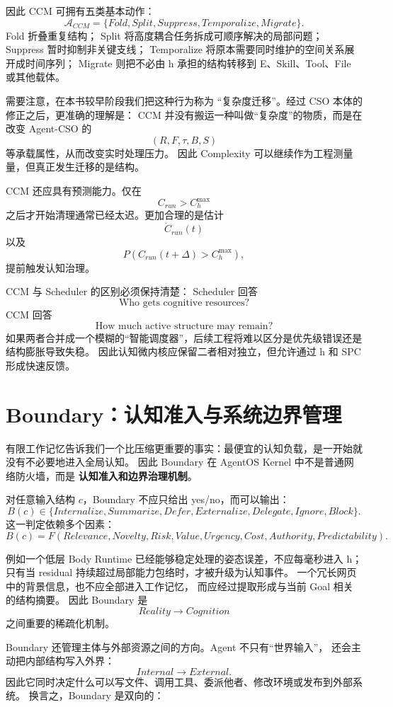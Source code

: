 因此 CCM 可拥有五类基本动作：
\[
\mathcal A_{CCM}
=
\{
Fold,
Split,
Suppress,
Temporalize,
Migrate
\}.
\]
Fold 折叠重复结构；
Split 将高度耦合任务拆成可顺序解决的局部问题；
Suppress 暂时抑制非关键支线；
Temporalize 将原本需要同时维护的空间关系展开成时间序列；
Migrate 则把不必由 h 承担的结构转移到 E、Skill、Tool、File 或其他载体。

需要注意，在本书较早阶段我们把这种行为称为
``复杂度迁移''。经过 CSO 本体的修正之后，更准确的理解是：
CCM 并没有搬运一种叫做``复杂度''的物质，而是在改变 Agent-CSO 的
\[
(R,F,\tau,B,S)
\]
等承载属性，从而改变实时处理压力。
因此 Complexity 可以继续作为工程测量量，但真正发生迁移的是结构。

CCM 还应具有预测能力。仅在
\[
C_{run}>C_h^{\max}
\]
之后才开始清理通常已经太迟。更加合理的是估计
\[
\dot C_{run}(t)
\]
以及
\[
P(C_{run}(t+\Delta)>C_h^{\max}),
\]
提前触发认知治理。

CCM 与 Scheduler 的区别必须保持清楚：
Scheduler 回答
\[
\text{Who gets cognitive resources?}
\]
CCM 回答
\[
\text{How much active structure may remain?}
\]
如果两者合并成一个模糊的``智能调度器''，后续工程将难以区分是优先级错误还是结构膨胀导致失稳。
因此认知微内核应保留二者相对独立，但允许通过 h 和 SPC 形成快速反馈。


\section{Boundary：认知准入与系统边界管理}

有限工作记忆告诉我们一个比压缩更重要的事实：最便宜的认知负载，是一开始就没有不必要地进入全局认知。
因此 Boundary 在 AgentOS Kernel 中不是普通网络防火墙，而是
\textbf{认知准入和边界治理机制}。

对任意输入结构 $c$，Boundary 不应只给出 yes/no，而可以输出：
\[
B(c)
\in
\{
Internalize,
Summarize,
Defer,
Externalize,
Delegate,
Ignore,
Block
\}.
\]
这一判定依赖多个因素：
\[
B(c)
=
F(
Relevance,
Novelty,
Risk,
Value,
Urgency,
Cost,
Authority,
Predictability
).
\]

例如一个低层 Body Runtime 已经能够稳定处理的姿态误差，不应每毫秒进入 h；
只有当 residual 持续超过局部能力包络时，才被升级为认知事件。
一个冗长网页中的背景信息，也不应全部进入工作记忆，
而应经过提取形成与当前 Goal 相关的结构摘要。
因此 Boundary 是
\[
Reality\rightarrow Cognition
\]
之间重要的稀疏化机制。

Boundary 还管理主体与外部资源之间的方向。Agent 不只有``世界输入''，
还会主动把内部结构写入外界：
\[
Internal\rightarrow External.
\]
因此它同时决定什么可以写文件、调用工具、委派他者、修改环境或发布到外部系统。
换言之，Boundary 是双向的：
\begin{statementbox}
\centering
{}
\end{statementbox}


